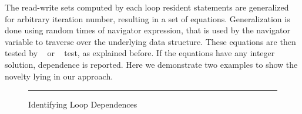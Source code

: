 The read-write sets computed by each loop resident statements are generalized 
for arbitrary iteration number, resulting in a set of equations. Generalization is done 
using random times of navigator expression, that is used by the navigator variable to traverse 
over the underlying data structure. These equations are then tested 
by ~\cite{Kennedy01Optimizing} or ~\cite{Lamport1974parallel} test, as explained before. If the equations have any integer solution, 
dependence is reported. 
Here we demonstrate two examples to show the novelty lying in our approach.
\begin{figure}[t]
  \begin{center}
  \end{center}
  \hrule
  \caption{\label{fig:loopdep} Identifying Loop Dependences}

\end{figure}
